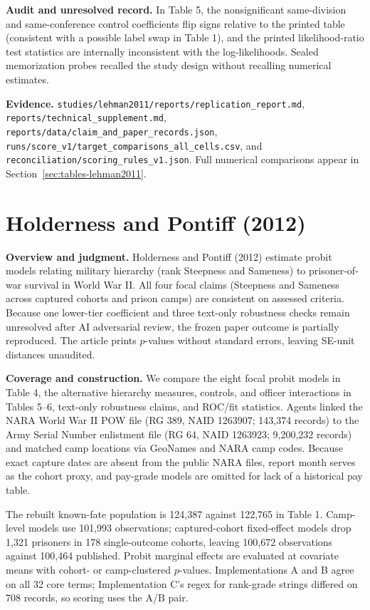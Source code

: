 \documentclass[11pt]{article}
\newcommand{\artifact}[1]{\nolinkurl{#1}}
\begin{document}
\textbf{Audit and unresolved record.} In Table 5, the nonsignificant same-division and same-conference control coefficients flip signs relative to the printed table (consistent with a possible label swap in Table 1), and the printed likelihood-ratio test statistics are internally inconsistent with the log-likelihoods. Sealed memorization probes recalled the study design without recalling numerical estimates.

\textbf{Evidence.} \artifact{studies/lehman2011/reports/replication_report.md}, \artifact{reports/technical_supplement.md}, \artifact{reports/data/claim_and_paper_records.json}, \artifact{runs/score_v1/target_comparisons_all_cells.csv}, and \artifact{reconciliation/scoring_rules_v1.json}. Full numerical comparisons appear in Section~\ref{sec:tables-lehman2011}.

\clearpage
\section{Holderness and Pontiff (2012)}\label{sec:holderness}
\textbf{Overview and judgment.} Holderness and Pontiff (2012) estimate probit models relating military hierarchy (rank Steepness and Sameness) to prisoner-of-war survival in World War II. All four focal claims (Steepness and Sameness across captured cohorts and prison camps) are consistent on assessed criteria. Because one lower-tier coefficient and three text-only robustness checks remain unresolved after AI adversarial review, the frozen paper outcome is partially reproduced. The article prints $p$-values without standard errors, leaving SE-unit distances unaudited.

\textbf{Coverage and construction.} We compare the eight focal probit models in Table 4, the alternative hierarchy measures, controls, and officer interactions in Tables 5--6, text-only robustness claims, and ROC/fit statistics. Agents linked the NARA World War II POW file (RG 389, NAID 1263907; 143,374 records) to the Army Serial Number enlistment file (RG 64, NAID 1263923; 9,200,232 records) and matched camp locations via GeoNames and NARA camp codes. Because exact capture dates are absent from the public NARA files, report month serves as the cohort proxy, and pay-grade models are omitted for lack of a historical pay table.

The rebuilt known-fate population is 124,387 against 122,765 in Table 1. Camp-level models use 101,993 observations; captured-cohort fixed-effect models drop 1,321 prisoners in 178 single-outcome cohorts, leaving 100,672 observations against 100,464 published. Probit marginal effects are evaluated at covariate means with cohort- or camp-clustered $p$-values. Implementations A and B agree on all 32 core terms; Implementation C's regex for rank-grade strings differed on 708 records, so scoring uses the A/B pair.
\end{document}
